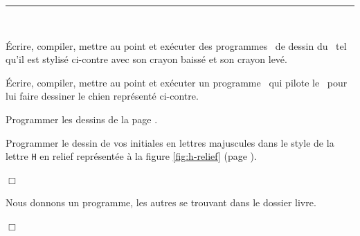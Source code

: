 \noindent \rule{137mm}{0.1mm} %
\begin{exercices}{\ \\

\vspace{-\baselineskip}
\noindent \begin{minipage}[t]{88mm}
\tiret Écrire, compiler, mettre au point et exécuter des programmes \ocaml\ de dessin du
\robot\ tel qu'il est stylisé ci-contre avec son
crayon baissé et son crayon levé.
\end{minipage}
\hfill
\begin{minipage}[t]{44mm}
\vspace{2.0cm}
\hspace{-4.4cm}  %
\end{minipage}

\noindent \begin{minipage}[t]{103mm}
\tiret  Écrire, compiler, mettre au point et exécuter un programme \ocaml\ qui
pilote le \robot\ pour lui faire dessiner le chien représenté
ci-contre.
\end{minipage}
\hfill
\begin{minipage}[t]{29mm}
\vspace{2.3cm}
\hspace{-2.9cm}  %
\end{minipage}

\noindent \begin{minipage}[t]{103mm}
\tiret  Programmer les dessins de la
pa\-ge \pageref{fig:quadrilateres}.
\end{minipage}

\vspace{1.5mm}

\tiret  Programmer le dessin de vos initiales en lettres majuscules
dans le style de la lettre {\tt H} en relief représentée à la
figure \ref{fig:h-relief} (page \pageref{fig:h-relief}).

\noindent $\Box$}\end{exercices}

\newpage
\begin{corrige}{Nous donnons un programme, les autres se trouvant dans le dossier {\idt livre}.

\noindent $\Box$}\end{corrige}

\vfill

